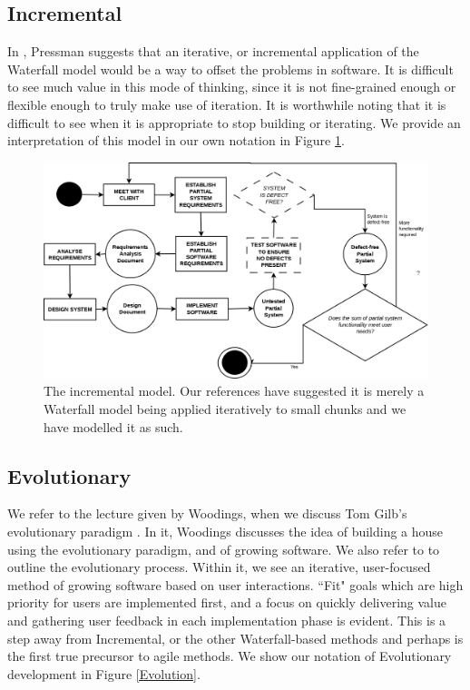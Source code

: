 \subsection{Incremental}
In \cite{pressman1992software}, Pressman suggests that an iterative, or incremental application of the
Waterfall model would be a way to offset the problems in software.
It is difficult to see much value in this mode of thinking, since it is not fine-grained enough or flexible
enough to truly make use of iteration.
It is worthwhile noting that it is difficult to see when it is appropriate to stop building or
iterating.
We provide an interpretation of this model in our own notation in Figure \ref{IncrementalFig}.

\begin{figure}
	\centering
	\includegraphics[scale=0.3]{media/Incremental}
	\caption{The incremental model. Our references have suggested it is merely a Waterfall model being
		applied iteratively to small chunks and we have modelled it as such.}
	\label{IncrementalFig}
\end{figure}

\subsection{Evolutionary}

We refer to the lecture given by Woodings, when we discuss Tom Gilb's evolutionary paradigm
\cite{Woodings2013Lecture2}.
In it, Woodings discusses the idea of building a house using the evolutionary paradigm, and of growing
software.
We also refer to \cite{gilb1999evolutionary} to outline the evolutionary
process.
Within it, we see an iterative, user-focused method of growing software based on
user interactions.
``Fit" goals which are high priority for users are implemented first, and a
focus on quickly delivering value and gathering user feedback in each
implementation phase is evident.
This is a step away from Incremental, or the other Waterfall-based methods and
perhaps is the first true precursor to agile methods.
We show our notation of Evolutionary development in Figure \ref{Evolution}.


